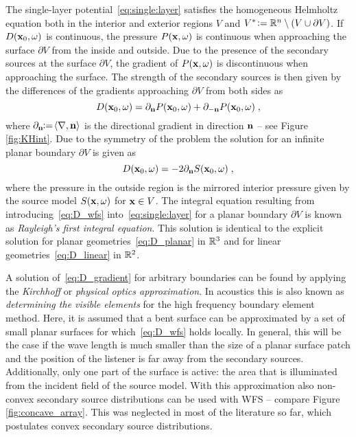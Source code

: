 The single-layer potential~\eqref{eq:single:layer} satisfies the homogeneous
Helmholtz equation
both in the interior and exterior regions $V$ and $V^*
\mathrel{\!\mathop:}= \mathbb{R}^n \setminus (V \cup \partial V)$.  If $D(\mathbf{x}_0,\omega)$ is
continuous, the pressure $P(\mathbf{x},\omega)$ is continuous when approaching the
surface $\partial V$ from the inside and outside.  Due to the presence of the
secondary sources at the surface $\partial V$, the gradient of $P(\mathbf{x},\omega)$ is
discontinuous when approaching the surface.
The strength of the secondary sources is then given by the differences of the
gradients approaching $\partial V$ from both sides
as 
%
\begin{equation}
    D(\x_0,\omega) = \partial_\n
    P(\x_0,\omega) + \partial_{-\n} P(\x_0,\omega)\qc
    \label{eq:D_gradient}
\end{equation}
%
where
$\partial_{\mathbf{n}}\!\mathrel{\!\mathop:}=\!\langle\nabla,\mathbf{n}\rangle$ is the directional gradient
in direction $\mathbf{n}$ -- see Figure\,\ref{fig:KHint}.
Due to the symmetry of the problem the solution for an infinite planar
boundary $\partial V$ is given as 
%
\begin{equation}
    D(\x_0,\omega) = -2 \partial_\n S(\x_0,\omega)\qc
    \label{eq:D_wfs}
\end{equation}
%
where the pressure in the outside region is the mirrored interior pressure given by the
source model $S(\mathbf{x},\omega)$ for $\mathbf{x} \in V$.  The
integral equation resulting from introducing~\eqref{eq:D_wfs}
into~\eqref{eq:single:layer} for a planar boundary $\partial V$ is known as
{\em Rayleigh's first integral equation}. This solution is identical
to the explicit solution for planar geometries~\eqref{eq:D_planar} in $\mathbb{R}^3$ and for
linear geometries~\eqref{eq:D_linear} in $\mathbb{R}^2$.

A solution of~\eqref{eq:D_gradient} for  arbitrary boundaries can be
found by applying the \emph{Kirchhoff} or \emph{physical optics
approximation}.
In acoustics this is also known as \emph{determining the visible elements} for
the high frequency boundary element
method.
Here, it is assumed that a
bent surface can be approximated by a set of small planar surfaces for
which~\eqref{eq:D_wfs} holds locally.  In general, this will be the case if the
wave length is much smaller than the size of a planar surface patch and the
position of the listener is far away from the secondary
sources.
Additionally, only one part of the surface is active: the area that is
illuminated from the incident field of the source model.
\FloatBarrier %
\noindent With this approximation
also non-convex secondary
source distributions can be used with
WFS -- compare
Figure\,\ref{fig:concave_array}.
This was neglected in most of the literature so far, which postulates
convex secondary source
distributions.


